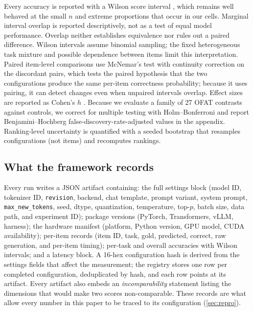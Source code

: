 Every accuracy is reported with a Wilson score interval
\citep{wilson1927probable}, which remains well behaved at the small $n$ and
extreme proportions that occur in our cells. Marginal interval overlap is
reported descriptively, not as a test of equal model performance. Overlap
neither establishes equivalence nor rules out a paired difference. Wilson
intervals assume binomial sampling; the fixed heterogeneous task mixture and
possible dependence between items limit this interpretation. Paired
item-level comparisons use McNemar's test \citep{mcnemar1947note} with
continuity correction on the discordant pairs, which tests the paired
hypothesis that the two configurations produce the same per-item correctness
probability; because it uses pairing, it can detect changes even when
unpaired intervals overlap. Effect sizes are reported as Cohen's $h$
\citep{cohen1988statistical}. Because we evaluate a family of 27 OFAT
contrasts against controls, we correct for multiple testing with
Holm--Bonferroni \citep{holm1979simple} and report Benjamini--Hochberg
false-discovery-rate-adjusted values \citep{benjamini1995controlling} in the
appendix. Ranking-level uncertainty is quantified with a seeded bootstrap
that resamples configurations (not items) and recomputes rankings.

\subsection{What the framework records}

Every run writes a JSON artifact containing: the full settings block (model
ID, tokenizer ID, \texttt{revision}, backend, chat template, prompt variant,
system prompt, \texttt{max\_new\_tokens}, seed, dtype, quantization,
temperature, top-$p$, batch size, data path, and experiment ID); package
versions (PyTorch, Transformers, vLLM, harness); the hardware manifest
(platform, Python version, GPU model, CUDA availability); per-item records
(item ID, task, gold, predicted, correct, raw generation, and per-item
timing); per-task and overall accuracies with Wilson intervals; and a
latency block. A 16-hex configuration hash is derived from the settings
fields that affect the measurement; the registry stores one row per
completed configuration, deduplicated by hash, and each row points at its
artifact. Every artifact also embeds an \emph{incomparability} statement
listing the dimensions that would make two scores non-comparable. These
records are what allow every number in this paper to be traced to its
configuration (\cref{sec:repro}).

